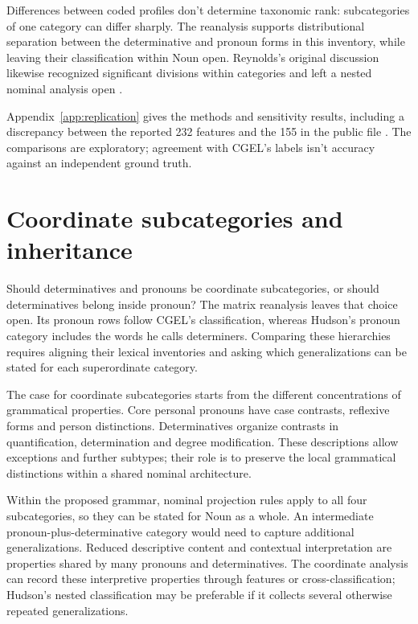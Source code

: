 \documentclass[12pt]{article}
\begin{document}
Differences between coded profiles don't determine taxonomic rank: subcategories of one category can differ sharply. The reanalysis supports distributional separation between the determinative and pronoun forms in this inventory, while leaving their classification within Noun open. Reynolds's original discussion likewise recognized significant divisions within categories and left a nested nominal analysis open \citep{reynolds2021}.

Appendix~\ref{app:replication} gives the methods and sensitivity results, including a discrepancy between the reported 232 features and the 155 in the public file \citep{reynolds2021matrix}. The comparisons are exploratory; agreement with CGEL's labels isn't accuracy against an independent ground truth.

\section{Coordinate subcategories and inheritance}\label{sec:inheritance}

Should determinatives and pronouns be coordinate subcategories, or should determinatives belong inside pronoun? The matrix reanalysis leaves that choice open. Its pronoun rows follow CGEL's classification, whereas Hudson's pronoun category includes the words he calls determiners. Comparing these hierarchies requires aligning their lexical inventories and asking which generalizations can be stated for each superordinate category.

The case for coordinate subcategories starts from the different concentrations of grammatical properties. Core personal pronouns have case contrasts, reflexive forms and person distinctions. Determinatives organize contrasts in quantification, determination and degree modification. These descriptions allow exceptions and further subtypes; their role is to preserve the local grammatical distinctions within a shared nominal architecture.

Within the proposed grammar, nominal projection rules apply to all four subcategories, so they can be stated for Noun as a whole. An intermediate pronoun-plus-determinative category would need to capture additional generalizations. Reduced descriptive content and contextual interpretation are properties shared by many pronouns and determinatives. The coordinate analysis can record these interpretive properties through features or cross-classification; Hudson's nested classification may be preferable if it collects several otherwise repeated generalizations.
\end{document}
